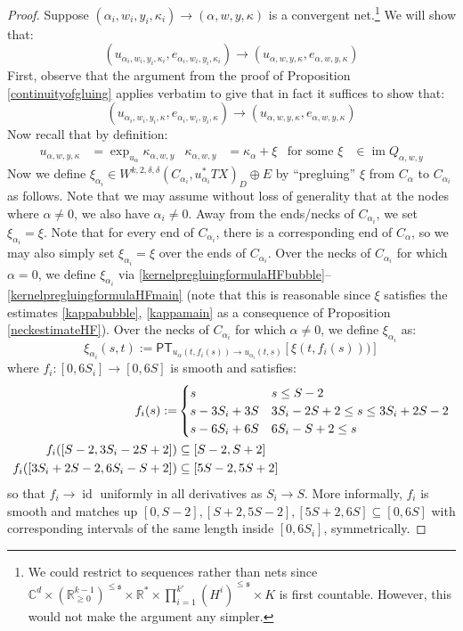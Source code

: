 \documentclass[12pt]{article}
\theoremstyle{definition}
\theoremstyle{remark}
\numberwithin{equation}{subsection}
\newcommand{\s}{\mathfrak s}
\newcommand{\CC}{\mathbb C}
\newcommand{\RR}{\mathbb R}
\newcommand{\PT}{\mathsf{PT}}
\newcommand{\im}{\operatorname{im}}
\newcommand{\id}{\operatorname{id}}
\begin{document}
\begin{proof}
Suppose $(\alpha_i,w_i,y_i,\kappa_i)\to(\alpha,w,y,\kappa)$ is a convergent net.\footnote{We could restrict to sequences rather than nets since $\CC^d\times(\RR_{\geq 0}^{k-1})^{\leq\s}\times\RR^\ast\times\prod_{i=1}^{k\prime}(H^i)^{\leq\s}\times K$ is first countable.  However, this would not make the argument any simpler.}  We will show that:
\begin{equation}
(u_{\alpha_i,w_i,y_i,\kappa_i},e_{\alpha_i,w_i,y_i,\kappa_i})\to(u_{\alpha,w,y,\kappa},e_{\alpha,w,y,\kappa})
\end{equation}
First, observe that the argument from the proof of Proposition \ref{continuityofgluing} applies verbatim to give that in fact it suffices to show that:
\begin{equation}
(u_{\alpha_i,w_i,y_i,\kappa},e_{\alpha_i,w_i,y_i,\kappa})\to(u_{\alpha,w,y,\kappa},e_{\alpha,w,y,\kappa})
\end{equation}
Now recall that by definition:
\begin{align}
u_{\alpha,w,y,\kappa}&=\exp_{u_\alpha}\kappa_{\alpha,w,y}&\kappa_{\alpha,w,y}&=\kappa_\alpha+\xi&\text{for some }\xi&\in\im Q_{\alpha,w,y}
\end{align}
Now we define $\xi_{\alpha_i}\in W^{k,2,\delta,\delta}(C_{\alpha_i},u_{\alpha_i}^\ast TX)_D\oplus E$ by ``pregluing'' $\xi$ from $C_\alpha$ to $C_{\alpha_i}$ as follows.  Note that we may assume without loss of generality that at the nodes where $\alpha\ne 0$, we also have $\alpha_i\ne 0$.  Away from the ends/necks of $C_{\alpha_i}$, we set $\xi_{\alpha_i}=\xi$.  Note that for every end of $C_{\alpha_i}$, there is a corresponding end of $C_\alpha$, so we may also simply set $\xi_{\alpha_i}=\xi$ over the ends of $C_{\alpha_i}$.  Over the necks of $C_{\alpha_i}$ for which $\alpha=0$, we define $\xi_{\alpha_i}$ via \eqref{kernelpregluingformulaHFbubble}--\eqref{kernelpregluingformulaHFmain} (note that this is reasonable since $\xi$ satisfies the estimates \eqref{kappabubble}, \eqref{kappamain} as a consequence of Proposition \ref{neckestimateHF}).  Over the necks of $C_{\alpha_i}$ for which $\alpha\ne 0$, we define $\xi_{\alpha_i}$ as:
\begin{equation}
\xi_{\alpha_i}(s,t):=\PT_{u_{\alpha}(t,f_i(s))\to u_{\alpha_i}(t,s)}[\xi(t,f_i(s)))]
\end{equation}
where $f_i:[0,6S_i]\to[0,6S]$ is smooth and satisfies:
\begin{align}
f_i(s):=&\begin{cases}
s&s\leq S-2\cr
s-3S_i+3S&3S_i-2S+2\leq s\leq 3S_i+2S-2\cr
s-6S_i+6S&6S_i-S+2\leq s\cr
\end{cases}\\
f_i([S-2,3S_i-2S+2])&\subseteq[S-2,S+2]\\
f_i([3S_i+2S-2,6S_i-S+2])&\subseteq[5S-2,5S+2]
\end{align}
so that $f_i\to\id$ uniformly in all derivatives as $S_i\to S$.  More informally, $f_i$ is smooth and matches up $[0,S-2],[S+2,5S-2],[5S+2,6S]\subseteq[0,6S]$ with corresponding intervals of the same length inside $[0,6S_i]$, symmetrically.


\end{proof}
\end{document}
